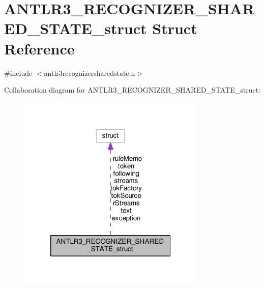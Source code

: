 \hypertarget{struct_a_n_t_l_r3___r_e_c_o_g_n_i_z_e_r___s_h_a_r_e_d___s_t_a_t_e__struct}{\section{A\-N\-T\-L\-R3\-\_\-\-R\-E\-C\-O\-G\-N\-I\-Z\-E\-R\-\_\-\-S\-H\-A\-R\-E\-D\-\_\-\-S\-T\-A\-T\-E\-\_\-struct Struct Reference}
\label{struct_a_n_t_l_r3___r_e_c_o_g_n_i_z_e_r___s_h_a_r_e_d___s_t_a_t_e__struct}
}


{\ttfamily \#include $<$antlr3recognizersharedstate.\-h$>$}



Collaboration diagram for A\-N\-T\-L\-R3\-\_\-\-R\-E\-C\-O\-G\-N\-I\-Z\-E\-R\-\_\-\-S\-H\-A\-R\-E\-D\-\_\-\-S\-T\-A\-T\-E\-\_\-struct\-:
\nopagebreak
\begin{figure}[H]
\begin{center}
\leavevmode
\includegraphics[width=254pt]{struct_a_n_t_l_r3___r_e_c_o_g_n_i_z_e_r___s_h_a_r_e_d___s_t_a_t_e__struct__coll__graph}
\end{center}
\end{figure}
